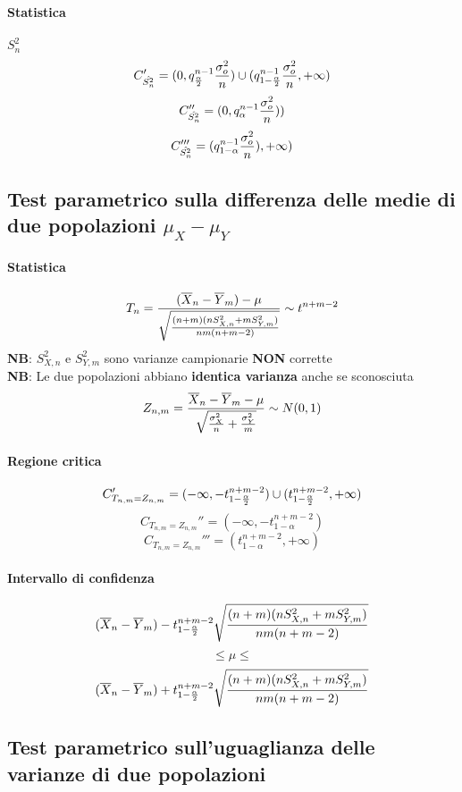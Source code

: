 \documentclass[12pt]{article}
\begin{document}
    \paragraph{Statistica} $S_n^2$
    $$C_{\hat{S_n^2}}' = (0, q_{\alpha \over 2}^{n-1}{\sigma_o^2 \over {n}}) \cup (q_{1-{\alpha \over 2}}^{n-1}{\sigma_o^2 \over {n}}, +\infty)$$
    $$C_{\hat{S_n^2}}'' = (0, q_\alpha^{n-1}{\sigma_o^2 \over {n}}))$$
    $$C_{\hat{S_n^2}}''' = (q_{1-\alpha}^{n-1}{\sigma_o^2 \over {n}}), +\infty)$$
    \newpage
    \subsection{Test parametrico sulla differenza delle medie di due popolazioni $\mu_X - \mu_Y$}
    \paragraph{Statistica} 
    $$T_n = {{(\overline{X}_n - \overline{Y}_m) - \mu} \over \sqrt{{(n+m)(nS_{X,n}^2+mS_{Y,m}^2)}\over{nm(n+m-2)}}} \sim t^{n+m-2}$$
    \textbf{NB}: $S^2_{X,n}$ e $S^2_{Y,m}$ sono varianze campionarie \textbf{NON} corrette
    \\\textbf{NB}: Le due popolazioni abbiano \textbf{identica varianza} anche se sconosciuta
    $$Z_{n,m} = {{\overline{X}_n - \overline{Y}_m - \mu}\over \sqrt{{\sigma_X^2 \over n}+{\sigma_Y^2 \over m}}} \sim N(0,1)$$
    \paragraph{Regione critica}
    $$C_{T_{n,m} = Z_{n, m}}' = (-\infty, -t^{n+m-2}_{1-{\alpha \over 2}}) \cup (t^{n+m-2}_{1-{\alpha \over 2}}, +\infty)$$
    $$C_{T_{n,m} = Z_{n, m}}'' = (-\infty, -t^{n+m-2}_{1-\alpha})$$
    $$C_{T_{n,m} = Z_{n, m}}''' = (t^{n+m-2}_{1-\alpha}, +\infty)$$
    \paragraph{Intervallo di confidenza}
    $$(\overline{X}_n - \overline{Y}_m) -t^{n+m-2}_{1-{\alpha \over 2}}\sqrt{{(n+m)(nS_{X,n}^2+mS_{Y,m}^2)}\over{nm(n+m-2)}}$$
    $$\leq \mu \leq$$ 
    $$ (\overline{X}_n - \overline{Y}_m) + t^{n+m-2}_{1-{\alpha \over 2}}\sqrt{{(n+m)(nS_{X,n}^2+mS_{Y,m}^2)}\over{nm(n+m-2)}}$$
    \newpage
    \subsection{Test parametrico sull'uguaglianza delle varianze di due popolazioni}
\end{document}

